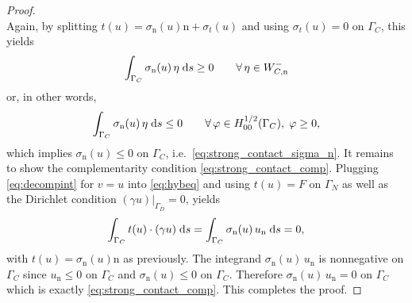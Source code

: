 \begin{proof}
\begin{equation*}
	\end{equation*}
	Again, by splitting $t(u) = \sigma_\mathrm{n}(u)\mathrm{n}+\sigma_t(u)$ and using $\sigma_t(u) = 0$ on $\Gamma_C$, this yields
	\begin{equation*}
		\int_{\Gamma_C}\sigma_\mathrm{n}(u)\,\eta\;{{\mathrm{d}} s} \ge 0\qquad\forall\,\eta\in W_{C,\mathrm{n}}^-
	\end{equation*}
	or, in other words,
	\begin{equation*}
		\int_{\Gamma_C}\sigma_\mathrm{n}(u)\,\eta\;{{\mathrm{d}} s} \le 0\qquad\forall\,\varphi\in H_{00}^{1/2}(\Gamma_C),\;\varphi\ge 0,
	\end{equation*}
	which implies $\sigma_\mathrm{n}(u)\le 0$ on $\Gamma_C$, i.e.\ \eqref{eq:strong_contact_sigma_n}. It remains to show the complementarity condition \eqref{eq:strong_contact_comp}. Plugging \eqref{eq:decompint} for $v = u$ into \eqref{eq:hybeq} and using $t(u) = F$ on $\Gamma_N$ as well as the Dirichlet condition $(\gamma u)|_{\Gamma_D} = 0$, yields
	\begin{equation*}
		\int_{\Gamma_C}t(u)\cdot(\gamma u)\;{{\mathrm{d}} s} = \int_{\Gamma_C} \sigma_\mathrm{n}(u)\, u_{\mathrm{n}}\;{{\mathrm{d}} s}  =  0,
	\end{equation*}
	with $t(u) = \sigma_\mathrm{n}(u)\mathrm{n}$ as previously. The integrand $\sigma_\mathrm{n}(u)\, u_{\mathrm{n}}$ is nonnegative on $\Gamma_C$ since $u_\mathrm{n}\le 0$ on $\Gamma_C$ and $\sigma_\mathrm{n}(u)\le 0$ on $\Gamma_C$. Therefore $\sigma_\mathrm{n}(u)\, u_{\mathrm{n}} = 0$ on $\Gamma_C$ which is exactly \eqref{eq:strong_contact_comp}. This completes the proof.
\end{proof}
